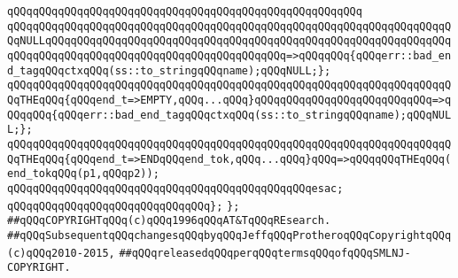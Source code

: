 \verb|qQQqqQQqqQQqqQQqqQQqqQQqqQQqqQQqqQQqqQQqqQQqqQQqqQQqqQQq|\newline
\verb|qQQqqQQqqQQqqQQqqQQqqQQqqQQqqQQqqQQqqQQqqQQqqQQqqQQqqQQqqQQqqQQqqQQqqQQqNULLqQQqqQQqqQQqqQQqqQQqqQQqqQQqqQQqqQQqqQQqqQQqqQQqqQQqqQQqqQQqqQQqqQQqqQQqqQQqqQQqqQQqqQQqqQQqqQQqqQQqqQQqqQQq=>qQQqqQQq{qQQqerr::bad_end_tagqQQqctxqQQq(ss::to_stringqQQqname);qQQqNULL;};|\newline
\verb|qQQqqQQqqQQqqQQqqQQqqQQqqQQqqQQqqQQqqQQqqQQqqQQqqQQqqQQqqQQqqQQqqQQqqQQqTHEqQQq{qQQqend_t=>EMPTY,qQQq...qQQq}qQQqqQQqqQQqqQQqqQQqqQQqqQQq=>qQQqqQQq{qQQqerr::bad_end_tagqQQqctxqQQq(ss::to_stringqQQqname);qQQqNULL;};|\newline
\verb|qQQqqQQqqQQqqQQqqQQqqQQqqQQqqQQqqQQqqQQqqQQqqQQqqQQqqQQqqQQqqQQqqQQqqQQqTHEqQQq{qQQqend_t=>ENDqQQqend_tok,qQQq...qQQq}qQQq=>qQQqqQQqTHEqQQq(end_tokqQQq(p1,qQQqp2));|\newline
\verb|qQQqqQQqqQQqqQQqqQQqqQQqqQQqqQQqqQQqqQQqqQQqqQQqesac;|\newline
\verb|qQQqqQQqqQQqqQQqqQQqqQQqqQQqqQQq};|\newline
\newline
\verb|};|\newline
\newline
\newline
\newline
\verb|##qQQqCOPYRIGHTqQQq(c)qQQq1996qQQqAT&TqQQqREsearch.|\newline
\verb|##qQQqSubsequentqQQqchangesqQQqbyqQQqJeffqQQqProtheroqQQqCopyrightqQQq(c)qQQq2010-2015,|\newline
\verb|##qQQqreleasedqQQqperqQQqtermsqQQqofqQQqSMLNJ-COPYRIGHT.|\newline

